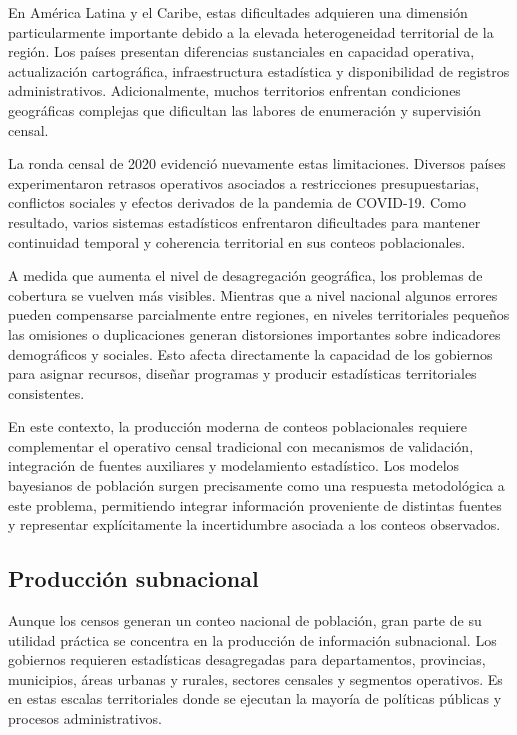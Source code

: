 \documentclass[
  spanish,
]{book}
\begin{document}
En América Latina y el Caribe, estas dificultades adquieren una dimensión particularmente importante debido a la elevada heterogeneidad territorial de la región. Los países presentan diferencias sustanciales en capacidad operativa, actualización cartográfica, infraestructura estadística y disponibilidad de registros administrativos. Adicionalmente, muchos territorios enfrentan condiciones geográficas complejas que dificultan las labores de enumeración y supervisión censal.

La ronda censal de 2020 evidenció nuevamente estas limitaciones. Diversos países experimentaron retrasos operativos asociados a restricciones presupuestarias, conflictos sociales y efectos derivados de la pandemia de COVID-19. Como resultado, varios sistemas estadísticos enfrentaron dificultades para mantener continuidad temporal y coherencia territorial en sus conteos poblacionales.

A medida que aumenta el nivel de desagregación geográfica, los problemas de cobertura se vuelven más visibles. Mientras que a nivel nacional algunos errores pueden compensarse parcialmente entre regiones, en niveles territoriales pequeños las omisiones o duplicaciones generan distorsiones importantes sobre indicadores demográficos y sociales. Esto afecta directamente la capacidad de los gobiernos para asignar recursos, diseñar programas y producir estadísticas territoriales consistentes.

En este contexto, la producción moderna de conteos poblacionales requiere complementar el operativo censal tradicional con mecanismos de validación, integración de fuentes auxiliares y modelamiento estadístico. Los modelos bayesianos de población surgen precisamente como una respuesta metodológica a este problema, permitiendo integrar información proveniente de distintas fuentes y representar explícitamente la incertidumbre asociada a los conteos observados.

\subsection{Producción subnacional}\label{producciuxf3n-subnacional}

Aunque los censos generan un conteo nacional de población, gran parte de su utilidad práctica se concentra en la producción de información subnacional. Los gobiernos requieren estadísticas desagregadas para departamentos, provincias, municipios, áreas urbanas y rurales, sectores censales y segmentos operativos. Es en estas escalas territoriales donde se ejecutan la mayoría de políticas públicas y procesos administrativos.
\end{document}
